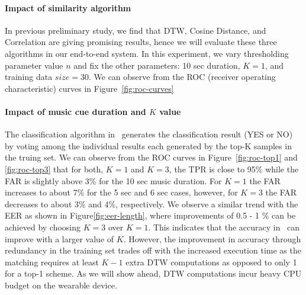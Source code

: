 \paragraph{Impact of similarity algorithm}
In previous preliminary study, we find that DTW, Cosine Distance, and Correlation are giving promising results, hence we will evaluate these three algorithms in our end-to-end system. In this  experiment, we vary thresholding parameter value $n$ and fix the other parameters: 10 sec duration, $K = 1$, and  training data $size = 30$. We can observe from the ROC 
(receiver operating characteristic) curves in Figure~\ref{fig:roc-curves}
\paragraph{Impact of music cue duration and $K$ value}

The classification algorithm in \systemname~generates the classification result (YES or NO) by voting among the individual results each generated by the top-K samples in the truing set. We can observe from the ROC curves in Figure~\ref{fig:roc-top1} and \ref{fig:roc-top3} that 
for both, $K=1$ and $K=3$, the TPR is close to 95\% while the FAR is slightly 
above 3\% for the 10 sec music duration. For $K = 1$ the FAR increases to 
about 7\% for the 5 sec and 6 sec cases, however, for $K = 3$ the FAR 
decreases to about 3\% and 4\%, respectively. 
We observe a similar trend with the EER as shown in 
Figure\ref{fig:eer-length}, where improvements of 0.5 - 1 \% 
can be achieved by choosing $K = 3$ over $K = 1$.
This indicates that the accuracy in \systemname~can improve with a larger 
value of $K$. However, the improvement in accuracy through redundancy in the 
training set trades off with the increased execution time as the 
matching requires at least $K - 1$  extra DTW computations as opposed to only 
1 for a top-1 scheme. As we will show ahead, DTW computations incur heavy CPU 
budget on the wearable device. 

